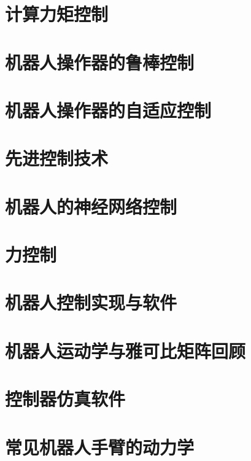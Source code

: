\documentclass[UTF8,a4paper,12pt]{ctexbook}
\theoremstyle{definition}
\begin{document}
\chapter{计算力矩控制}


\chapter{机器人操作器的鲁棒控制}


\chapter{机器人操作器的自适应控制}


\chapter{先进控制技术}


\chapter{机器人的神经网络控制}


\chapter{力控制}


\chapter{机器人控制实现与软件}


\appendix
\chapter{机器人运动学与雅可比矩阵回顾}


\chapter{控制器仿真软件}


\chapter{常见机器人手臂的动力学}


\backmatter
\end{document}
